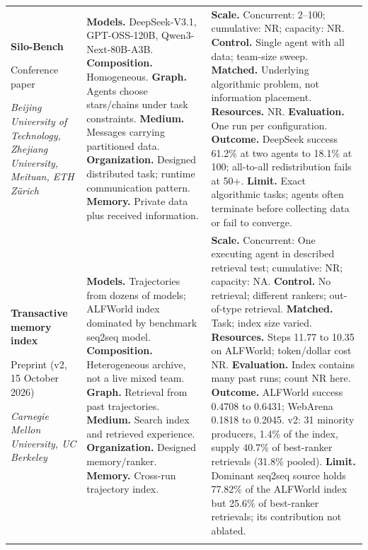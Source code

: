 \begin{longtable}{@{}>{\raggedright\arraybackslash}p{}>{\raggedright\arraybackslash}p{}>{\raggedright\arraybackslash}p{}@{}}
\textbf{Silo-Bench}\par \citep{silo-bench}\par Conference paper\par\emph{Beijing University of Technology, Zhejiang University, Meituan, ETH Zürich} & \textbf{Models.} DeepSeek-V3.1, GPT-OSS-120B, Qwen3-Next-80B-A3B. \textbf{Composition.} Homogeneous. \textbf{Graph.} Agents choose stars/chains under task constraints. \textbf{Medium.} Messages carrying partitioned data. \textbf{Organization.} Designed distributed task; runtime communication pattern. \textbf{Memory.} Private data plus received information. & \textbf{Scale.} Concurrent: 2--100; cumulative: NR; capacity: NR. \textbf{Control.} Single agent with all data; team-size sweep. \textbf{Matched.} Underlying algorithmic problem, not information placement. \textbf{Resources.} NR. \textbf{Evaluation.} One run per configuration. \textbf{Outcome.} DeepSeek success 61.2\% at two agents to 18.1\% at 100; all-to-all redistribution fails at 50+. \textbf{Limit.} Exact algorithmic tasks; agents often terminate before collecting data or fail to converge. \\ \addlinespace[5pt]
\textbf{Transactive memory index}\par \citep{multi-agent-transactive-memory}\par Preprint (v2, 15 October 2026)\par\emph{Carnegie Mellon University, UC Berkeley} & \textbf{Models.} Trajectories from dozens of models; ALFWorld index dominated by benchmark seq2seq model. \textbf{Composition.} Heterogeneous archive, not a live mixed team. \textbf{Graph.} Retrieval from past trajectories. \textbf{Medium.} Search index and retrieved experience. \textbf{Organization.} Designed memory/ranker. \textbf{Memory.} Cross-run trajectory index. & \textbf{Scale.} Concurrent: One executing agent in described retrieval test; cumulative: NR; capacity: NA. \textbf{Control.} No retrieval; different rankers; out-of-type retrieval. \textbf{Matched.} Task; index size varied. \textbf{Resources.} Steps 11.77 to 10.35 on ALFWorld; token/dollar cost NR. \textbf{Evaluation.} Index contains many past runs; count NR here. \textbf{Outcome.} ALFWorld success 0.4708 to 0.6431; WebArena 0.1818 to 0.2045. v2: 31 minority producers, 1.4\% of the index, supply 40.7\% of best-ranker retrievals (31.8\% pooled). \textbf{Limit.} Dominant seq2seq source holds 77.82\% of the ALFWorld index but 25.6\% of best-ranker retrievals; its contribution not ablated. \\ \addlinespace[5pt]

\end{longtable}

